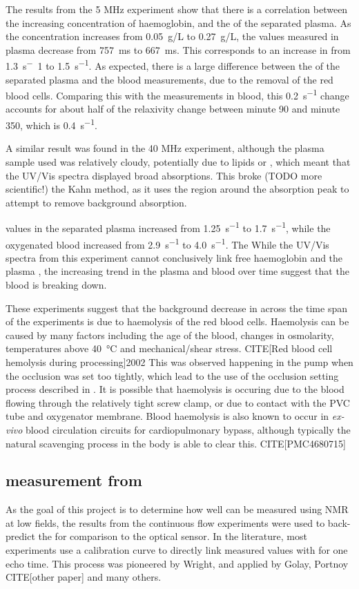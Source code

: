 The results from the 5 MHz experiment show that there is a correlation between the increasing concentration of haemoglobin, and the \Rtwo of the separated plasma.
As the concentration increases from \SI{0.05}{g/L} to \SI{0.27}{g/L}, the \Ttwo values measured in plasma decrease from \SI{757}{ms} to \SI{667}{ms}.
This corresponds to an increase in \Rtwo from \SI{1.3}{s^-1} to \SI{1.5}{s^{-1}}.
As expected, there is a large difference between the \Ttwo of the separated plasma and the blood measurements, due to the removal of the red blood cells.
Comparing this with the \Rtwo measurements in blood, this \SI{0.2}{s^{-1}} change accounts for about half of the relaxivity change between minute 90 and minute 350, which is \SI{0.4}{s^{-1}}.

A similar result was found in the 40 MHz experiment, although the plasma sample used was relatively cloudy, potentially due to lipids or , which meant that the UV/Vis spectra displayed broad absorptions.
This broke (TODO more scientific!) the Kahn method, as it uses the region around the absorption peak to attempt to remove background absorption.

\Rtwo values in the separated plasma increased from \SI{1.25}{s^{-1}} to \SI{1.7}{s^{-1}}, while the oxygenated blood increased from \SI{2.9}{s^{-1}} to \SI{4.0}{s^{-1}}.
The
While the UV/Vis spectra from this experiment cannot conclusively link free haemoglobin and the plasma \Rtwo, the increasing trend in the plasma \Rtwo and blood \Rtwo over time suggest that the blood is breaking down.

These experiments suggest that the background decrease in \Ttwo across the time span of the experiments is due to haemolysis of the red blood cells.
Haemolysis can be caused by many factors including the age of the blood, changes in osmolarity, temperatures above \SI{40}{\celsius} and mechanical/shear stress. CITE[Red blood cell hemolysis during processing]2002
This was observed happening in the pump when the occlusion was set too tightly, which lead to the use of the occlusion setting process described in .
It is possible that haemolysis is occuring due to the blood flowing through the relatively tight screw clamp, or due to contact with the PVC tube and oxygenator membrane.
Blood haemolysis is also known to occur in \textit{ex-vivo} blood circulation circuits for cardiopulmonary bypass, although typically the natural scavenging process in the body is able to clear this. CITE[PMC4680715]


\subsection{\SOtwo measurement from \Ttwo}
As the goal of this project is to determine how well \SOtwo can be measured using NMR at low fields, the results from the continuous flow experiments were used to back-predict the \SOtwo for comparison to the optical sensor.
In the literature, most experiments use a calibration curve to directly link measured \Ttwo values with \SOtwo for one echo time.
This process was pioneered by Wright\cite{WrightEstimatingoxygensaturation1991}, and applied by Golay\cite{GolayMeasurementtissueoxygen2001}, Portnoy CITE[other paper] and many others.

